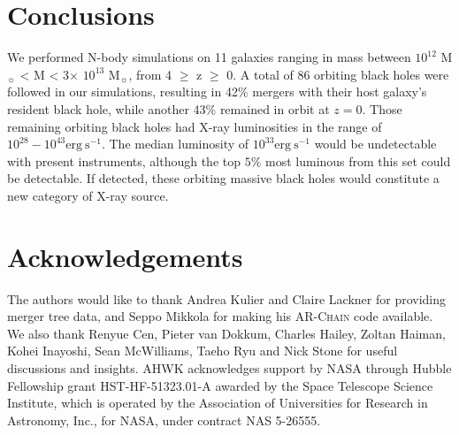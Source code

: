 \documentclass[fleqn,usenatbib,useAMS]{mnras}
\begin{document}
\section{Conclusions}\label{sec:conclusions}
We performed N-body simulations on 11 galaxies ranging in mass between $10^{12}$ M$_{\sun}$ < M < 3$\times$ $10^{13}$ M$_{\sun}$, from 4 $\geq$ z $\geq$ 0.  A total of 86 orbiting black holes were followed in our simulations, resulting in 42$\%$ mergers with their host galaxy's resident black hole, while another 43$\%$ remained in orbit at $z=0$.  Those remaining orbiting black holes had X-ray luminosities in the range of $10^{28}-10^{43}\mathrm{erg}~\mathrm{s}^{-1}$.  The median luminosity of $10^{33}\mathrm{erg}~\mathrm{s}^{-1}$ would be undetectable with present instruments, although the top $5\%$ most luminous from this set could be detectable.  If detected, these orbiting massive black holes would constitute a new category of X-ray source.

\section{Acknowledgements}
The authors would like to thank Andrea Kulier and Claire Lackner for providing merger tree data, and Seppo Mikkola for making his \textsc{AR-Chain} code available. We also thank Renyue Cen, Pieter van Dokkum, Charles Hailey, Zoltan Haiman, Kohei Inayoshi, Sean McWilliams, Taeho Ryu and Nick Stone for useful discussions and insights.  AHWK acknowledges support by NASA through Hubble Fellowship grant HST-HF-51323.01-A awarded by the Space Telescope Science Institute, which is operated by the Association of Universities for Research in Astronomy, Inc., for NASA, under contract NAS 5-26555.








\bsp	%
\label{lastpage}
\end{document}
